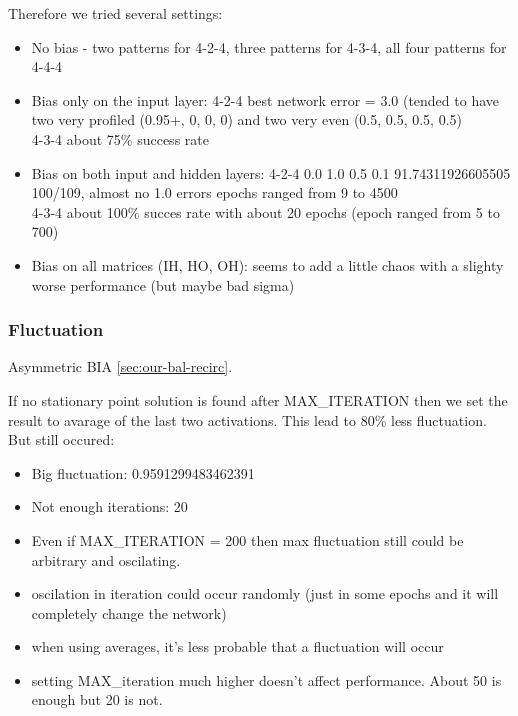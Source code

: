 Therefore we tried several settings: 
\begin{itemize} 
\item No bias - two patterns for 4-2-4, three patterns for 4-3-4, all four patterns for 4-4-4
\item Bias only on the input layer:  
4-2-4 best network error = 3.0 (tended to have two very profiled (0.95+, 0, 0, 0) and two very even (0.5, 0.5, 0.5, 0.5)  \\
4-3-4 about 75\% success rate 
\item Bias on both input and hidden layers: 
    4-2-4 0.0 1.0 0.5 0.1 91.74311926605505 100/109, almost no 1.0 errors 
          epochs ranged from 9 to 4500 \\ 
    4-3-4 about 100\% succes rate with about 20 epochs (epoch ranged from 5 to 700) 
\item Bias on all matrices (IH, HO, OH): 
    seems to add a little chaos with a slighty worse performance (but maybe bad sigma)

\end{itemize} 

\subsubsection{Fluctuation} 
\label{sec:generec-fluctuation}

Asymmetric BIA \ref{sec:our-bal-recirc}.

If no stationary point solution is found after MAX\_ITERATION then we set the result to avarage of the last two activations. This lead to 80\% less fluctuation. But still occured: 
\begin{itemize}
\item Big fluctuation: 0.9591299483462391
\item Not enough iterations: 20
\item Even if MAX\_ITERATION = 200 then max fluctuation still could be arbitrary and oscilating.
\end{itemize} 

\begin{itemize} 
  \item oscilation in iteration could occur randomly (just in some epochs and it will completely change the network) 
  \item when using averages, it's less probable that a fluctuation will occur 
  \item setting MAX\_iteration much higher doesn't affect performance. About 50 is enough but 20 is not. 
\end{itemize} 
  
